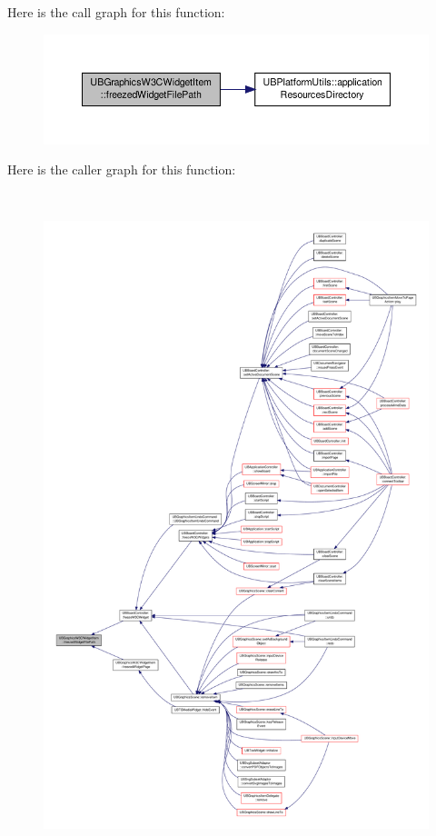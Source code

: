 Here is the call graph for this function\-:
\nopagebreak
\begin{figure}[H]
\begin{center}
\leavevmode
\includegraphics[width=350pt]{d7/da7/class_u_b_graphics_w3_c_widget_item_adc5e2a6da0f030dbcf3b1fe0b4f1cfd6_cgraph}
\end{center}
\end{figure}




Here is the caller graph for this function\-:
\nopagebreak
\begin{figure}[H]
\begin{center}
\leavevmode
\includegraphics[height=550pt]{d7/da7/class_u_b_graphics_w3_c_widget_item_adc5e2a6da0f030dbcf3b1fe0b4f1cfd6_icgraph}
\end{center}
\end{figure}


